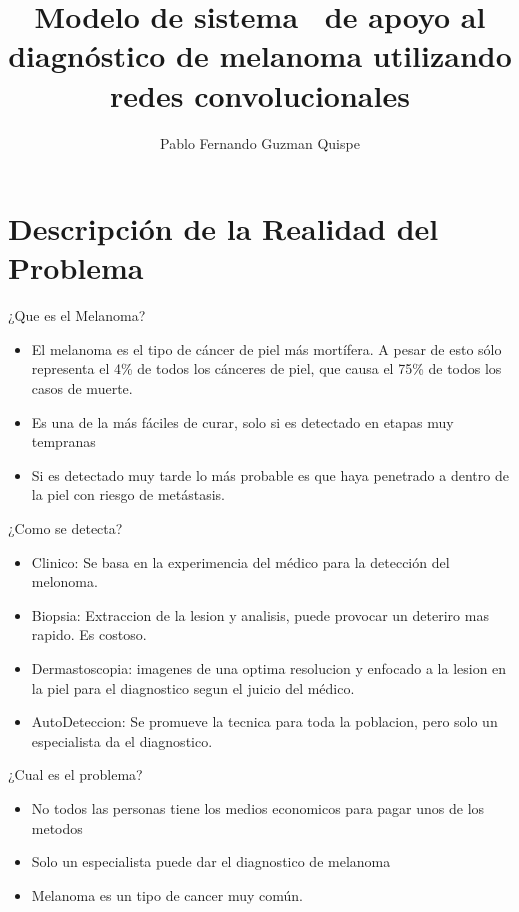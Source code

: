 \documentclass{beamer}
\title[Modelo de sistema  de apoyo al diagnóstico de melanoma utilizando redes convolucionales]{Modelo de sistema  de apoyo al diagnóstico de melanoma utilizando redes convolucionales}
\author[A. Author]{Pablo Fernando Guzman Quispe}
\begin{document}
	\typesetFrontSlides


\section{Descripción de la Realidad del Problema}
\begin{frame}{¿Que es el Melanoma?}

\begin{itemize}
	\item El melanoma es el tipo de cáncer de piel más mortífera. A pesar de esto sólo representa el 4\% de todos los cánceres de piel, que causa el 75\% de todos los casos de muerte.

	\item Es una de la más fáciles de curar, solo si es detectado en etapas muy tempranas
	
	\item Si es detectado muy tarde lo más probable es que haya penetrado a dentro de la piel con riesgo de metástasis.
	
\end{itemize}
\end{frame} 

\begin{frame}{¿Como se detecta?}
\begin{itemize}
	\item Clinico: Se basa en la experimencia del médico para la detección del melonoma.
	
	\item Biopsia: Extraccion de la lesion y analisis, puede provocar un deteriro mas rapido. Es costoso.
	
	\item Dermastoscopia: imagenes de una optima resolucion y enfocado a la lesion en la piel para el diagnostico segun el juicio del médico.
	
	\item AutoDeteccion: Se promueve la tecnica para toda la poblacion, pero solo un especialista da el diagnostico.

	
\end{itemize}
\end{frame} 

\begin{frame}{¿Cual es el problema?}

\begin{itemize}
	\item No todos las personas tiene los medios economicos para pagar unos de los metodos
	
	\item Solo un especialista puede dar el diagnostico de melanoma
	
	\item Melanoma es un tipo de cancer muy común.
	
\end{itemize}
\end{frame} 
\end{document}
